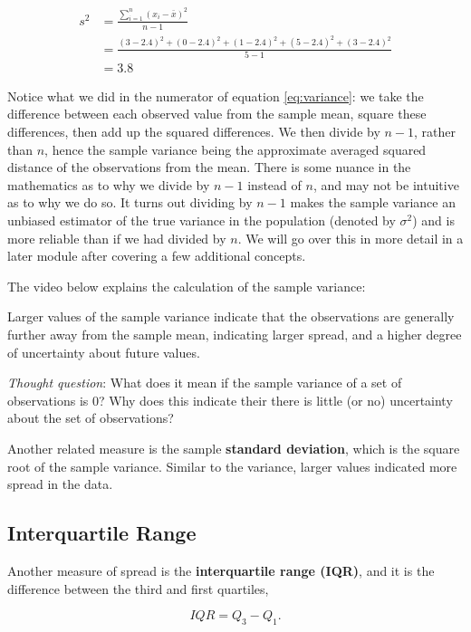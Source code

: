 \documentclass[
]{book}
\begin{document}
\[
\begin{split}
s^2 &= \frac{\sum_{i=1}^n (x_i-\bar{x})^2}{n-1}\\
 &= \frac{(3-2.4)^2 + (0-2.4)^2 + (1-2.4)^2 + (5-2.4)^2 + (3-2.4)^2}{5-1} \\
&= 3.8 
\end{split}
\]

Notice what we did in the numerator of equation \eqref{eq:variance}: we take the difference between each observed value from the sample mean, square these differences, then add up the squared differences. We then divide by \(n-1\), rather than \(n\), hence the sample variance being the approximate averaged squared distance of the observations from the mean. There is some nuance in the mathematics as to why we divide by \(n-1\) instead of \(n\), and may not be intuitive as to why we do so. It turns out dividing by \(n-1\) makes the sample variance an unbiased estimator of the true variance in the population (denoted by \(\sigma^2\)) and is more reliable than if we had divided by \(n\). We will go over this in more detail in a later module after covering a few additional concepts.

The video below explains the calculation of the sample variance:

Larger values of the sample variance indicate that the observations are generally further away from the sample mean, indicating larger spread, and a higher degree of uncertainty about future values.

\emph{Thought question}: What does it mean if the sample variance of a set of observations is 0? Why does this indicate their there is little (or no) uncertainty about the set of observations?

Another related measure is the sample \textbf{standard deviation}, which is the square root of the sample variance. Similar to the variance, larger values indicated more spread in the data.

\subsection{Interquartile Range}\label{interquartile-range}

Another measure of spread is the \textbf{interquartile range (IQR)}, and it is the difference between the third and first quartiles,

\begin{equation} 
IQR = Q_3 - Q_1.
\label{eq:IQR}
\end{equation}
\end{document}

